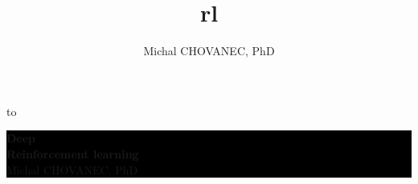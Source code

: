 \documentclass[xcolor=dvipsnames]{beamer}
\title{\color{white} \bf rl}
\author{\color{white} Michal CHOVANEC, PhD}
\date[EURP]{}
\begin{document}
{
    \usebackgroundtemplate
    {
        \vbox to 
    }
    \begin{frame}



    \centering
     \colorbox{black}
     {
        \begin{minipage}{7cm}
           {\LARGE \color{white} \bf Deep \\ Reinforcement learning} \\
           {\LARGE \color{white} Michal CHOVANEC, PhD} \\
       \end{minipage}
     }


    \end{frame}
}
\end{document}
